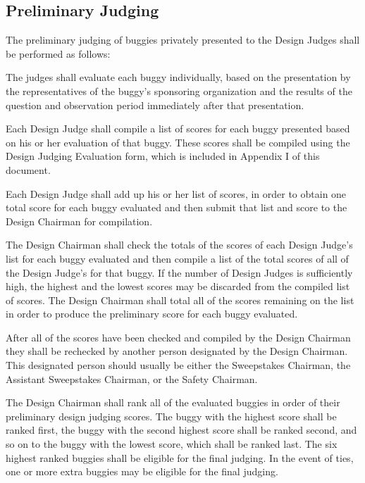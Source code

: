 \subsection{Preliminary Judging}

	The preliminary judging of buggies privately presented to the Design Judges
	shall be performed as follows:
	\newline

	The judges shall evaluate each buggy individually, based on the presentation by
	the representatives of the buggy's sponsoring organization and the results of
	the question and observation period immediately after that presentation.

	Each Design Judge shall compile a list of scores for each buggy presented based
	on his or her evaluation of that buggy. These scores shall be compiled using
	the Design Judging Evaluation form, which is included in Appendix I of this
	document.

	Each Design Judge shall add up his or her list of scores, in order to obtain
	one total score for each buggy evaluated and then submit that list and score to
	the Design Chairman for compilation.

	The Design Chairman shall check the totals of the scores of each Design Judge's
	list for each buggy evaluated and then compile a list of the total scores of
	all of the Design Judge's for that buggy. If the number of Design Judges is
	sufficiently high, the highest and the lowest scores may be discarded from the
	compiled list of scores. The Design Chairman shall total all of the scores
	remaining on the list in order to produce the preliminary score for each buggy
	evaluated.

	After all of the scores have been checked and compiled by the Design Chairman
	they shall be rechecked by another person designated by the Design Chairman.
	This designated person should usually be either the Sweepstakes Chairman, the
	Assistant Sweepstakes Chairman, or the Safety Chairman.

	The Design Chairman shall rank all of the evaluated buggies in order of their
	preliminary design judging scores. The buggy with the highest score shall be
	ranked first, the buggy with the second highest score shall be ranked second,
	and so on to the buggy with the lowest score, which shall be ranked last. The
	six highest ranked buggies shall be eligible for the final judging. In the
	event of ties, one or more extra buggies may be eligible for the final judging.

